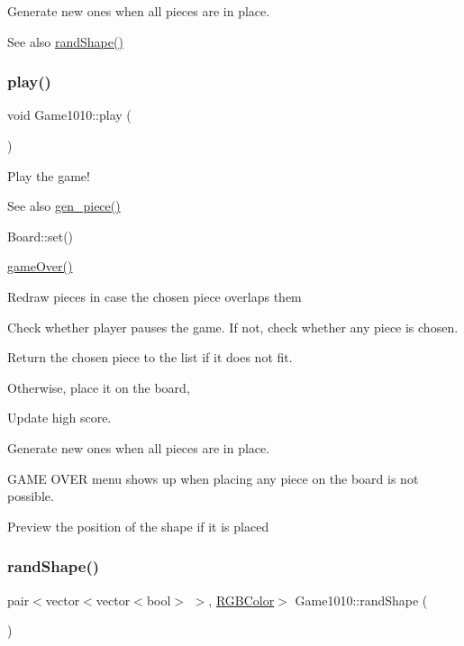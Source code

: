 Generate new ones when all pieces are in place. 

\begin{DoxySeeAlso}{See also}
\mbox{\hyperlink{class_game1010_a9b86f7bf4ad3af111014ad33a781ffe5}{rand\+Shape()}} 
\end{DoxySeeAlso}
\mbox{\label{class_game1010_afa18a3a81b8966417a228459a5bebf53}} 
\subsubsection{\texorpdfstring{play()}{play()}}
{\footnotesize\ttfamily void Game1010\+::play (\begin{DoxyParamCaption}{ }\end{DoxyParamCaption})\hspace{0.3cm}{\ttfamily [inline]}}



Play the game! 

\begin{DoxySeeAlso}{See also}
\mbox{\hyperlink{class_game1010_a9576170947a355682c922cb648432b9e}{gen\+\_\+piece()}} 

Board\+::set() 

\mbox{\hyperlink{class_game1010_a3bc296b7ba6bffeda3baceb1240190b6}{game\+Over()}} 
\end{DoxySeeAlso}
Redraw pieces in case the chosen piece overlaps them

Check whether player pauses the game. If not, check whether any piece is chosen.

Return the chosen piece to the list if it does not fit.

Otherwise, place it on the board,

Update high score.

Generate new ones when all pieces are in place.

G\+A\+ME O\+V\+ER menu shows up when placing any piece on the board is not possible.

Preview the position of the shape if it is placed \mbox{\label{class_game1010_a9b86f7bf4ad3af111014ad33a781ffe5}} 
\subsubsection{\texorpdfstring{rand\+Shape()}{randShape()}}
{\footnotesize\ttfamily pair$<$vector$<$vector$<$bool$>$ $>$, \mbox{\hyperlink{class_r_g_b_color}{R\+G\+B\+Color}}$>$ Game1010\+::rand\+Shape (\begin{DoxyParamCaption}{ }\end{DoxyParamCaption})\hspace{0.3cm}{\ttfamily [inline]}}



